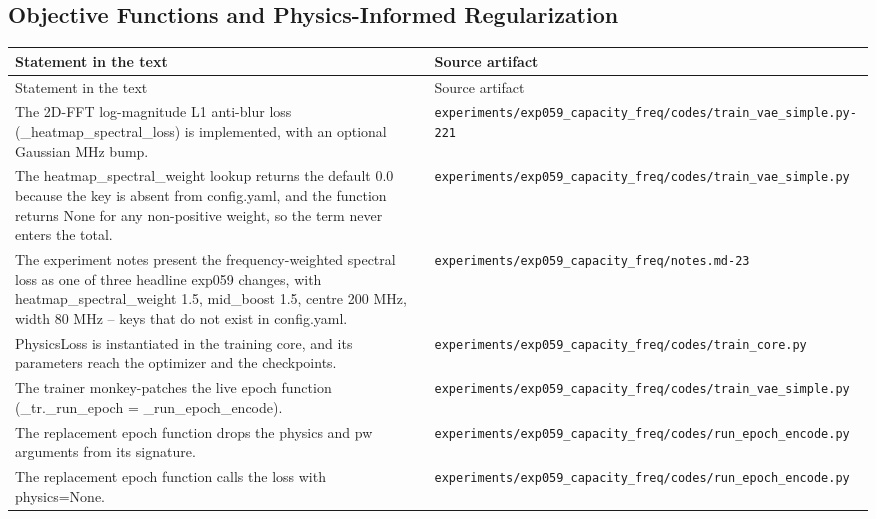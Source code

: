 \subsection*{Objective Functions and Physics-Informed Regularization}
\begingroup\small
\begin{longtable}{p{} p{}}
\hline
Statement in the text & Source artifact \\
\hline
\endfirsthead
\hline
Statement in the text & Source artifact \\
\hline
\endhead
The 2D-FFT log-magnitude L1 anti-blur loss (\_heatmap\_spectral\_loss) is implemented, with an optional Gaussian MHz bump. & \texttt{experiments/\allowbreak{}exp059\_\allowbreak{}capacity\_\allowbreak{}freq/\allowbreak{}codes/\allowbreak{}train\_\allowbreak{}vae\_\allowbreak{}simple.py-221} \\
The heatmap\_spectral\_weight lookup returns the default 0.0 because the key is absent from config.yaml, and the function returns None for any non-positive weight, so the term never enters the total. & \texttt{experiments/\allowbreak{}exp059\_\allowbreak{}capacity\_\allowbreak{}freq/\allowbreak{}codes/\allowbreak{}train\_\allowbreak{}vae\_\allowbreak{}simple.py} \\
The experiment notes present the frequency-weighted spectral loss as one of three headline exp059 changes, with heatmap\_spectral\_weight 1.5, mid\_boost 1.5, centre 200 MHz, width 80 MHz -- keys that do not exist in config.yaml. & \texttt{experiments/\allowbreak{}exp059\_\allowbreak{}capacity\_\allowbreak{}freq/\allowbreak{}notes.md-23} \\
PhysicsLoss is instantiated in the training core, and its parameters reach the optimizer and the checkpoints. & \texttt{experiments/\allowbreak{}exp059\_\allowbreak{}capacity\_\allowbreak{}freq/\allowbreak{}codes/\allowbreak{}train\_\allowbreak{}core.py} \\
The trainer monkey-patches the live epoch function (\_tr.\_run\_epoch = \_run\_epoch\_encode). & \texttt{experiments/\allowbreak{}exp059\_\allowbreak{}capacity\_\allowbreak{}freq/\allowbreak{}codes/\allowbreak{}train\_\allowbreak{}vae\_\allowbreak{}simple.py} \\
The replacement epoch function drops the physics and pw arguments from its signature. & \texttt{experiments/\allowbreak{}exp059\_\allowbreak{}capacity\_\allowbreak{}freq/\allowbreak{}codes/\allowbreak{}run\_\allowbreak{}epoch\_\allowbreak{}encode.py} \\
The replacement epoch function calls the loss with physics=None. & \texttt{experiments/\allowbreak{}exp059\_\allowbreak{}capacity\_\allowbreak{}freq/\allowbreak{}codes/\allowbreak{}run\_\allowbreak{}epoch\_\allowbreak{}encode.py} \\

\end{longtable}
